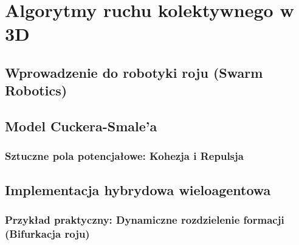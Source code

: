 \chapter{Algorytmy ruchu kolektywnego w 3D}
\section{Wprowadzenie do robotyki roju (Swarm Robotics)}

\section{Model Cuckera-Smale'a}
\subsection{Sztuczne pola potencjałowe: Kohezja i Repulsja}

\section{Implementacja hybrydowa wieloagentowa}
\subsection{Przykład praktyczny: Dynamiczne rozdzielenie formacji (Bifurkacja roju)}
